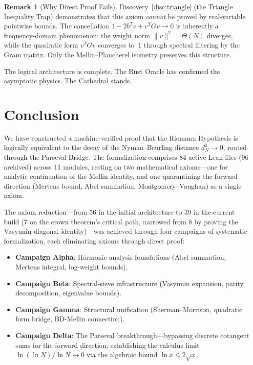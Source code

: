 \documentclass[11pt,a4paper]{article}
\theoremstyle{definition}
\newtheorem{remark}[definition]{Remark}
\begin{document}
\begin{remark}[Why Direct Proof Fails]
Discovery~\ref{disc:triangle} (the Triangle Inequality Trap) demonstrates
that this axiom \emph{cannot} be proved by real-variable pointwise bounds.
The cancellation $1 - 2b^Tv + v^TGv \to 0$ is inherently a frequency-domain
phenomenon: the weight norm $\|v\|^2 = \Theta(N)$ diverges, while the
quadratic form $v^TGv$ converges to~$1$ through spectral filtering by the
Gram matrix. Only the Mellin--Plancherel isometry preserves this structure.
\end{remark}

The logical architecture is complete. The Rust Oracle has confirmed
the asymptotic physics. The Cathedral stands.

\section{Conclusion}

We have constructed a machine-verified proof that the Riemann Hypothesis
is logically equivalent to the decay of the Nyman--Beurling distance
$d_N^2 \to 0$, routed through the Parseval Bridge. The formalization
comprises 84 active Lean files (96 archived) across 11 modules, resting
on two mathematical axioms---one for analytic continuation of the
Mellin identity, and one quarantining the forward direction
(Mertens bound, Abel summation, Montgomery--Vaughan) as a single axiom.

The axiom reduction---from 56 in the initial architecture to 39 in
the current build (7 on the crown theorem's critical path, narrowed
from 8 by proving the Vasyunin diagonal identity)---was
achieved through four campaigns of systematic
formalization, each eliminating axioms through direct proof:
\begin{itemize}
  \item \textbf{Campaign Alpha}: Harmonic analysis foundations (Abel
    summation, Mertens integral, log-weight bounds).
  \item \textbf{Campaign Beta}: Spectral-sieve infrastructure
    (Vasyunin expansion, parity decomposition, eigenvalue bounds).
  \item \textbf{Campaign Gamma}: Structural unification (Sherman--Morrison,
    quadratic form bridge, BD-Mellin connection).
  \item \textbf{Campaign Delta}: The Parseval breakthrough---bypassing
    discrete cotangent sums for the forward direction, establishing the
    calculus limit $\ln(\ln N)/\ln N \to 0$ via the algebraic bound
    $\ln x \le 2\sqrt{x}$.
\end{itemize}
\end{document}

